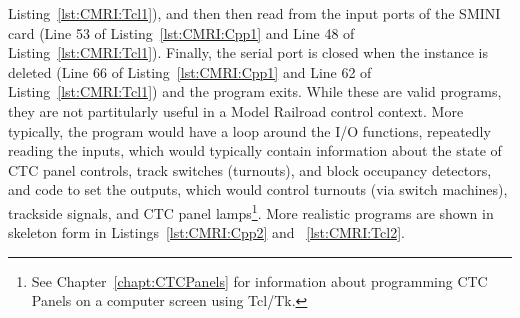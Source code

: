 Listing~\ref{lst:CMRI:Tcl1}), and then then read from the input ports
of the SMINI card (Line 53 of Listing~\ref{lst:CMRI:Cpp1} and Line 48
of Listing~\ref{lst:CMRI:Tcl1}). Finally, the serial port is closed
when the instance is deleted (Line 66 of Listing~\ref{lst:CMRI:Cpp1}
and Line 62 of Listing~\ref{lst:CMRI:Tcl1}) and the program exits.
While these are valid programs, they are not partitularly useful in a
Model Railroad control context.  More typically, the program would have
a loop around the I/O functions, repeatedly reading the inputs, which
would typically contain information about the state of CTC panel
controls, track switches (turnouts), and block occupancy detectors, and
code to set the outputs, which would control turnouts (via switch machines),
trackside signals, and CTC panel lamps\footnote{See
Chapter~\ref{chapt:CTCPanels} for information about programming CTC
Panels on a computer screen using Tcl/Tk.}.  More realistic programs
are shown in skeleton form in Listings~\ref{lst:CMRI:Cpp2} and
~\ref{lst:CMRI:Tcl2}.

